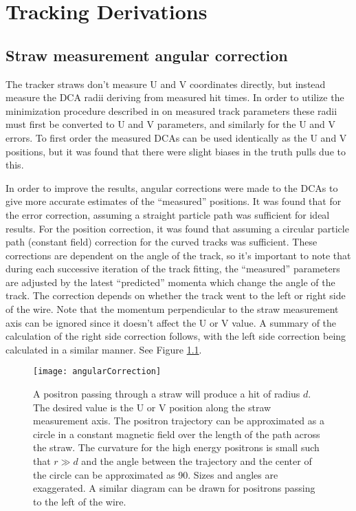 
\thispagestyle{myheadings}

\graphicspath{{Body/Figures/TrackingFigures/CoordSys/}}

\chapter{Tracking Derivations}

\section{Straw measurement angular correction}
\label{app:angularcorrection}


The tracker straws don't measure U and V coordinates directly, but instead measure the DCA radii deriving from measured hit times. In order to utilize the minimization procedure described in  on measured track parameters these radii must first be converted to U and V parameters, and similarly for the U and V errors. To first order the measured DCAs can be used identically as the U and V positions, but it was found that there were slight biases in the truth pulls due to this.

In order to improve the results, angular corrections were made to the DCAs to give more accurate estimates of the ``measured'' positions. It was found that for the error correction, assuming a straight particle path was sufficient for ideal results. For the position correction, it was found that assuming a circular particle path (constant field) correction for the curved tracks was sufficient. These corrections are dependent on the angle of the track, so it's important to note that during each successive iteration of the track fitting, the ``measured'' parameters are adjusted by the latest ``predicted'' momenta which change the angle of the track. The correction depends on whether the track went to the left or right side of the wire. Note that the momentum perpendicular to the straw measurement axis can be ignored since it doesn't affect the U or V value. A summary of the calculation of the right side correction follows, with the left side correction being calculated in a similar manner. See Figure \ref{fig:angularCorrection}. 

\begin{figure}
	\centering
	\texttt{[image: angularCorrection]}
	\caption[Angular correction for measured DCAs]{A positron passing through a straw will produce a hit of radius $d$. The desired value is the U or V position along the straw measurement axis. The positron trajectory can be approximated as a circle in a constant magnetic field over the length of the path across the straw. The curvature for the high energy positrons is small such that $r \gg d$ and the angle between the trajectory and the center of the circle can be approximated as 90\textdegree{}. Sizes and angles are exaggerated. A similar diagram can be drawn for positrons passing to the left of the wire.}
	\label{fig:angularCorrection}
\end{figure}

